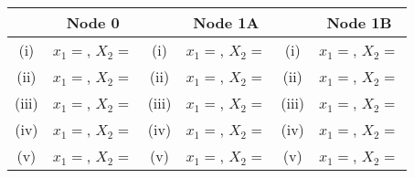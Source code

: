 \begin{tabular}{|c|c|c|c|c|c|}
	\hline  & Node 0 &   & Node 1A &  & Node 1B \\  \hline
	\hline (i) & $x_1= $, $X_2 = $ & (i) & $x_1= $, $X_2 = $ & (i) & $x_1= $, $X_2 = $ \\  \hline
	\hline (ii)  & $x_1= $, $X_2 = $  & (ii)  & $x_1= $, $X_2 = $ & (ii) & $x_1= $, $X_2 = $ \\  \hline
	\hline (iii) & $x_1= $, $X_2 = $  & (iii) & $x_1= $, $X_2 = $ & (iii) & $x_1= $, $X_2 = $ \\  \hline
	\hline (iv)  & $x_1= $, $X_2 = $  & (iv) & $x_1= $, $X_2 = $ & (iv) & $x_1= $, $X_2 = $ \\  \hline
	\hline (v) & $x_1= $, $X_2 = $ & (v)  & $x_1= $, $X_2 = $ & (v) & $x_1= $, $X_2 = $ \\  \hline
	\hline 
\end{tabular} 
